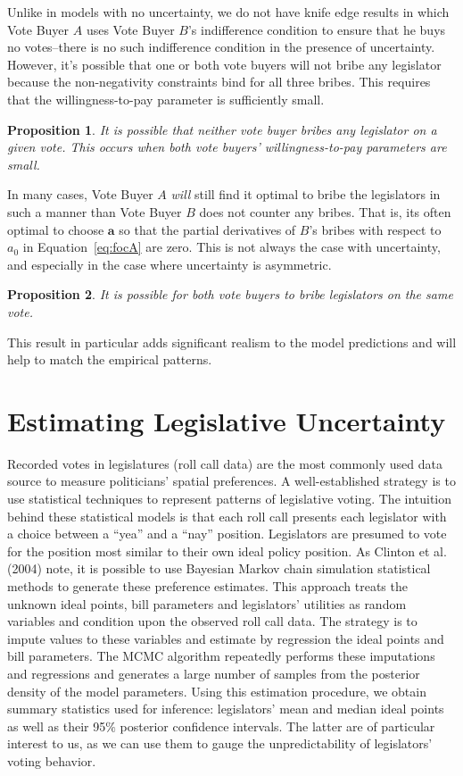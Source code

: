 \documentclass[12pt]{article}
\newtheorem{proposition}{Proposition}
\begin{document}
Unlike in models with no uncertainty, we do not have knife edge results in which Vote Buyer $A$ uses Vote Buyer $B$'s indifference condition to ensure that he buys no votes--there is no such indifference condition in the presence of uncertainty. However, it's possible that one or both vote buyers will not bribe any legislator because the non-negativity constraints bind for all three bribes. This requires that the willingness-to-pay parameter is sufficiently small.
		
\begin{proposition}
  It is possible that neither vote buyer bribes any legislator on a given vote. This occurs when both vote buyers' willingness-to-pay parameters are small.
\end{proposition}

In many cases, Vote Buyer $A$ \textit{will} still find it optimal to bribe the legislators in such a manner than Vote Buyer $B$ does not counter any bribes. That is, its often optimal to choose $\bm a$ so that the partial derivatives of $B$'s bribes with respect to $a_0$ in Equation~\ref{eq:focA} are zero. This is not always the case with uncertainty, and especially in the case where uncertainty is asymmetric.

\begin{proposition}
  It is possible for both vote buyers to bribe legislators on the same vote.
\end{proposition}

This result in particular adds significant realism to the model predictions and will help to match the empirical patterns.
		
		
\section{Estimating Legislative Uncertainty}
\label{sec:est}

Recorded votes in legislatures (roll call data) are the most commonly used data source to measure politicians' spatial preferences. A well-established strategy is to use statistical techniques to represent patterns of legislative voting. The intuition behind these statistical models is that each roll call presents each legislator with a choice between a ``yea'' and a ``nay'' position. Legislators are presumed to vote for the position most similar to their own ideal policy position. As Clinton et al. (2004) note, it is possible to use Bayesian Markov chain simulation statistical methods to generate these preference estimates. This approach treats the unknown ideal points, bill parameters and legislators' utilities as random variables and condition upon the observed roll call data. The strategy is to impute values to these variables and estimate by regression the ideal points and bill parameters. The MCMC algorithm repeatedly performs these imputations and regressions and generates a large number of samples from the posterior density of the model parameters. Using this estimation procedure, we obtain summary statistics used for inference: legislators' mean and median ideal points as well as their 95$\%$ posterior confidence intervals. The latter are of particular interest to us, as we can use them to gauge the unpredictability of  legislators' voting behavior.
\end{document}
